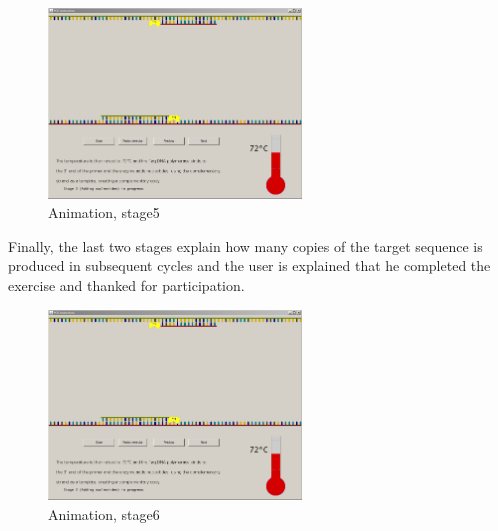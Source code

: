 \begin{figure}[h]
  \begin{center}
	\includegraphics[width=0.6\textwidth]{./images/AnimImpl/Stage3}
    \caption{
      \label{fig:AnimImpl:stage5}
      Animation, stage5
    }
  \end{center}
\end{figure}

Finally, the last two stages explain how many copies of the target sequence is produced in subsequent cycles and the user is explained that he completed the exercise and thanked for participation.

\begin{figure}[h]
  \begin{center}
	\includegraphics[width=0.6\textwidth]{./images/AnimImpl/Stage3}
    \caption{
      \label{fig:AnimImpl:stage6}
      Animation, stage6
    }
  \end{center}
\end{figure}